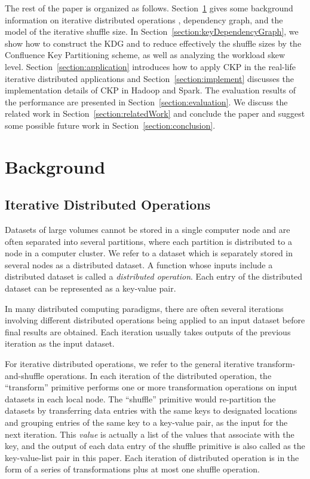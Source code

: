 \documentclass[10pt,journal,compsoc]{IEEEtran}
\begin{document}
The rest of the paper is organized as follows. Section~\ref{section:background}
gives some background information on iterative distributed operations
, dependency graph, and the model of the iterative shuffle size.
In Section~\ref{section:keyDependencyGraph}, we show how to construct
the KDG and to reduce effectively the shuffle sizes by the Confluence Key
Partitioning scheme, as well as analyzing the workload skew level.
Section~\ref{section:application} introduces how to apply CKP in
the real-life iterative distributed applications 
and Section~\ref{section:implement} discusses the
implementation details of CKP in Hadoop and Spark.
The evaluation results of the performance are presented in Section~\ref{section:evaluation}. 
We discuss the related work in Section~\ref{section:relatedWork} and
conclude the paper and suggest some possible future work in
Section~\ref{section:conclusion}.


\section{Background}\label{section:background}
\subsection{Iterative Distributed Operations}
Datasets of large volumes cannot be stored in a single computer node
and are often separated into several partitions, 
where each partition is distributed to a node in a computer cluster. 
We refer to a dataset which is separately stored in several nodes as a distributed dataset. 
A function whose inputs include a distributed dataset is called a \emph{distributed operation}.
Each entry of the distributed dataset can be represented as a key-value pair. 

In many distributed computing paradigms, there are often several
iterations involving different distributed operations being applied
to an input dataset before final results are obtained. 
Each iteration usually takes outputs of the previous iteration as
the input dataset. 

For iterative distributed
operations, we refer to the general iterative transform-and-shuffle operations. 
In each iteration of the distributed operation, 
the ``transform'' primitive performs one or more transformation operations on 
input datasets in each local node.
The ``shuffle'' primitive would
re-partition the datasets by transferring data entries with
the same keys to designated locations and grouping entries of the same key to a key-value pair, as the input for the next iteration. 
This \textit{value} is actually a list of the values that associate with the key, 
and the output of each data entry of the shuffle primitive is also called as the key-value-list pair in this paper.
Each iteration of distributed operation is in the form of a series of transformations plus at most one shuffle operation.
\end{document}
